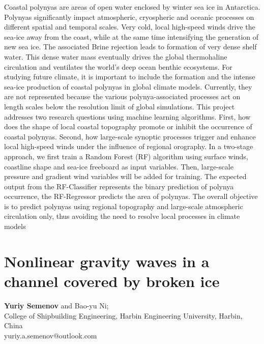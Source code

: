 \documentclass[9pt,a4paper,oneside]{book}
\numberwithin{equation}{section}
\begin{document}
Coastal polynyas are areas of open water enclosed by winter sea ice in Antarctica.
Polynyas significantly impact atmospheric, cryospheric and oceanic processes on different 
spatial and temporal scales. Very cold, local high-speed winds drive the sea-ice away from 
the coast, while at the same time intensifying the generation of new sea ice. The associated
Brine rejection leads to formation of very dense shelf water. This dense water mass 
eventually drives the global thermohaline circulation and ventilates the world’s deep ocean 
benthic ecosystems.
For studying future climate, it is important to include the formation and the intense 
sea-ice production of coastal polynyas in global climate models. Currently, they are not 
represented because the various polynya-associated processes act on length scales below the 
resolution limit of global simulations.
This project addresses two research questions using machine learning algorithms.
First, how does the shape of local coastal topography promote or inhibit the occurrence of
coastal polynyas. Second, how large-scale synoptic processes trigger and enhance local high-speed winds under the influence of regional orography. In a two-stage approach, we first train 
a Random Forest (RF) algorithm using surface winds, coastline shape and sea-ice freeboard 
as input variables. Then, large-scale pressure and gradient wind variables will be added for 
training. The expected output from the RF-Classifier represents the binary prediction of 
polynya occurrence, the RF-Regressor predicts the area of polynyas. The overall objective is 
to predict polynyas using regional topography and large-scale atmospheric circulation only, 
thus avoiding the need to resolve local processes in climate models

\section*{Nonlinear gravity waves in a channel covered by broken ice}
 \label{abs:9}
   {\bf Yuriy Semenov} and Bao-yu Ni;\\
College of Shipbuilding Engineering, Harbin Engineering University, Harbin, China \\
yuriy.a.semenov@outlook.com\\
\end{document}
